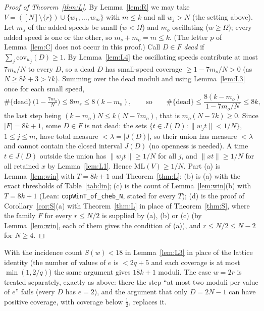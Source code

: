 \documentclass[11pt]{article}
\theoremstyle{definition}
\theoremstyle{remark}
\newcommand{\nd}[1]{\lVert #1\rVert}
\newcommand{\ML}{\mathrm{ML}}
\begin{document}
\begin{proof}[Proof of Theorem~\ref{thm:L}]
By Lemma~\ref{lem:R} we may take $V=([N]\setminus\{r\})\cup\{w_1,\dots,w_m\}$ with $m\le k$ and all $w_j>N$ (the setting above). Let $m_s$ of the added speeds be small ($w<\Omega$) and $m_o$ oscillating ($w\ge\Omega$); every added speed is one or the other, so $m_s+m_o=m\le k$. (The letter $p$ of Lemma~\ref{lem:C} does not occur in this proof.) Call $D\in F$ \emph{dead} if $\sum_{j}\mathrm{cov}_{w_j}(D)\ge1$. By Lemma~\ref{lem:L4} the oscillating speeds contribute at most $7m_o/N$ to every $D$, so a dead $D$ has small-speed coverage $\ge1-7m_o/N>0$ (as $N\ge8k+3>7k$). Summing over the dead moduli and using Lemma~\ref{lem:L3} once for each small speed,
\[
\#\{\text{dead}\}\,\bigl(1-\tfrac{7m_o}N\bigr)\le8m_s\le8(k-m_o),\qquad\text{so}\qquad \#\{\text{dead}\}\le\frac{8(k-m_o)}{1-7m_o/N}\le8k,
\]
the last step being $(k-m_o)N\le k(N-7m_o)$, that is $m_o(N-7k)\ge0$. Since $|F|=8k+1$, some $D\in F$ is not dead: the sets $\{t\in J(D):\nd{w_jt}<1/N\}$, $1\le j\le m$, have total measure $<\lambda=|J(D)|$, so their union has measure $<\lambda$ and cannot contain the closed interval $J(D)$ (no openness is needed). A time $t\in J(D)$ outside the union has $\nd{w_jt}\ge1/N$ for all $j$, and $\nd{xt}\ge1/N$ for all retained $x$ by Lemma~\ref{lem:L1}. Hence $\ML(V)\ge1/N$. Part (a) is Lemma~\ref{lem:win} with $T=8k+1$ and Theorem~\ref{thm:L}; (b) is (a) with the exact thresholds of Table~\ref{tab:lin}; (c) is the count of Lemma~\ref{lem:win}(b) with $T=8k+1$ (Lean: \texttt{copWinT\_of\_cheb\_N}, stated for every $T$); (d) is the proof of Corollary~\ref{cor:S}(a) with Theorem~\ref{thm:L} in place of Theorem~\ref{thm:S}, where the family $F$ for every $r\le N/2$ is supplied by (a), (b) or (c) (by Lemma~\ref{lem:win}, each of them gives the condition of (a)), and $r\le N/2\le N-2$ for $N\ge4$.
\end{proof}
With the incidence count $S(w)<18$ in Lemma~\ref{lem:L3} in place of the lattice identity (the number of values of $e$ is $<2q+5$ and each coverage is at most $\min(1,2/q)$) the same argument gives $18k+1$ moduli. The case $w=2r$ is treated separately, exactly as above: there the step ``at most two moduli per value of $e$'' fails (every $D$ has $e=2$), and the argument that only $D=2N-1$ can have positive coverage, with coverage below $\frac12$, replaces it.
\end{document}
